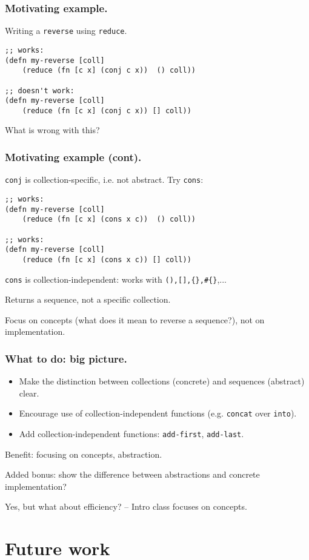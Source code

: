 \documentclass{beamer}
\begin{document}
\begin{frame}[fragile]
  \frametitle{Motivating example.}
Writing a {\tt reverse} using {\tt reduce}. 
\begin{verbatim}
;; works:
(defn my-reverse [coll]
    (reduce (fn [c x] (conj c x))  () coll)) 

;; doesn't work:
(defn my-reverse [coll]
    (reduce (fn [c x] (conj c x)) [] coll)) 
\end{verbatim}
What is wrong with this?
\end{frame}

\begin{frame}[fragile]
  \frametitle{Motivating example (cont).}
{\tt conj} is collection-specific, i.e. not abstract. Try {\tt cons}:

\begin{verbatim}
;; works:
(defn my-reverse [coll]
    (reduce (fn [c x] (cons x c))  () coll)) 

;; works:
(defn my-reverse [coll]
    (reduce (fn [c x] (cons x c)) [] coll)) 
\end{verbatim}
{\tt cons} is collection-independent: works with {\tt (),[],\{\},\#\{\}},...

Returns a sequence, not a specific collection. 

Focus on concepts (what does it mean to reverse a sequence?), not on implementation. 
\end{frame}

\begin{frame}[fragile]
  \frametitle{What to do: big picture.}
\begin{itemize}
\item Make the distinction between collections (concrete) and sequences (abstract) clear. 
\item Encourage use of collection-independent functions (e.g. {\tt concat} over {\tt into}).
\item Add collection-independent functions: {\tt add-first}, {\tt add-last}.
\end{itemize}
Benefit: focusing on concepts, abstraction. 

Added bonus: show the difference between abstractions and concrete implementation?

Yes, but what about efficiency? -- Intro class focuses on concepts. 
\end{frame}

\section{Future work}
\end{document}
